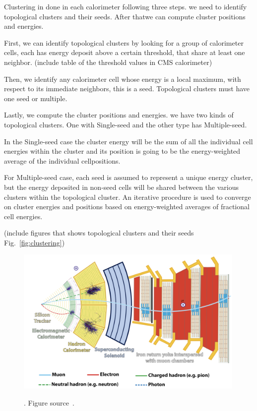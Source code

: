 Clustering in done in each calorimeter following three steps. we need to identify topological clusters and their seeds. After thatwe can compute cluster positions and energies.

First, we can identify topological clusters by looking for a group of calorimeter cells, each has energy deposit above a certain threshold, that share at least one neighbor. (include table of the threshold values in CMS calorimeter)

Then, we identify any calorimeter cell whose energy is a local maximum, with respect to its immediate neighbors, this is a seed. Topological clusters must have one seed or multiple.

Lastly, we compute the cluster positions and energies. we have two kinds of topological clusters. One with Single-seed and the other type has Multiple-seed.

In the Single-seed case the cluster energy will be the sum of all the individual cell energies within the cluster and its position is going to be the energy-weighted average of the individual cellpositions.

For Multiple-seed case, each seed is assumed to represent a unique energy cluster, but the energy deposited in non-seed cells will be shared between the various clusters within the topological cluster. An iterative procedure is used to converge on cluster energies and positions based on energy-weighted averages of fractional cell energies. 

(include figures that shows topological clusters and their seeds Fig.~\ref{fig:clustering}) 


\begin{figure}[t!]
\centering
\includegraphics[width=0.99\textwidth]{figures/particles_signture_in_detector.png}
\caption[particles_signture_in_detector]{}. Figure source~\cite{SMtable}.                                                                        
\label{fig:Particles_in_CMS}                                                                                                               
\end{figure}

